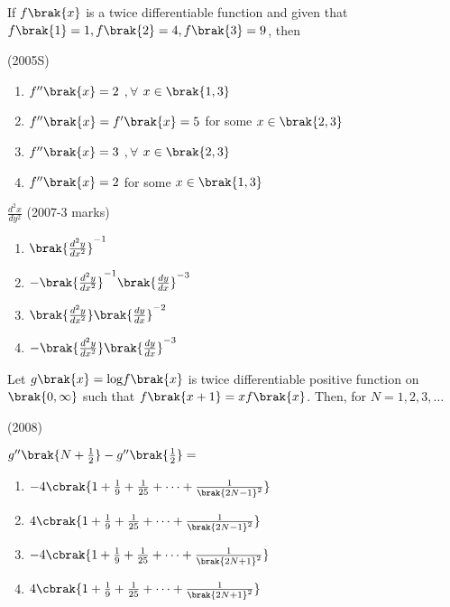 \iffalse
  \title{Assignment}
  \author{AI24BTECH11022 - Pabbuleti Venkata Charan Teja}
  \section{mcq-single}
\fi

\item
If $f\brak{x}$ is a twice differentiable function and given that $f\brak{1}=1,f\brak{2}=4,f\brak{3}=9$, then 

\hfill{(2005S)}

\begin{enumerate}
\item
$f^{\prime\prime}\brak{x}=2$ $,\forall$ $x\in\brak{1,3}$

\item $f^{\prime\prime}\brak{x}=f^{\prime}\brak{x}=5$ for some $x\in\brak{2,3}$

\item $f^{\prime\prime}\brak{x}=3$ $,\forall$ $x\in\brak{2,3}$

\item $f^{\prime\prime}\brak{x}=2$ for some $x\in\brak{1,3}$
\end{enumerate}

\item
$\frac{d^{2}x}{dy^{2}}$ \hfill{(2007-3 marks)}

\begin{multicols}{2}
\begin{enumerate}
\item$\brak{\frac{d^{2}y}{dx^{2}}}^{-1}$
\item$-\brak{\frac{d^{2}y}{dx^{2}}}^{-1}\brak{\frac{dy}{dx}}^{-3}$
\item$\brak{\frac{d^{2}y}{dx^{2}}}\brak{\frac{dy}{dx}}^{-2}$
\item$-\brak{\frac{d^{2}y}{dx^{2}}}\brak{\frac{dy}{dx}}^{-3}$
\end{enumerate}    
\end{multicols}

\item
Let $g\brak{x}=\text{log}f\brak{x}$ is twice differentiable positive function on $\brak{0,\infty}$ such that ${f\brak{x+1}=xf\brak{x}}$. Then, for $N=1,2,3,\dots$ 

\hfill{(2008)}

$g^{\prime\prime}\brak{N+\frac{1}{2}}-g^{\prime\prime}\brak{\frac{1}{2}}=$

\begin{enumerate}
\item$-4 \cbrak{1+\frac{1}{9}+\frac{1}{25}+\dots+\frac{1}{\brak{2N-1}^{2}}}$

\item $4\cbrak{1+\frac{1}{9}+\frac{1}{25}+\dots+\frac{1}{\brak{2N-1}^{2}}}$

\item $-4\cbrak{1+\frac{1}{9}+\frac{1}{25}+\dots+\frac{1}{\brak{2N+1}^{2}}}$

\item $4\cbrak{1+\frac{1}{9}+\frac{1}{25}+\dots+\frac{1}{\brak{2N+1}^{2}}}$
\end{enumerate}

